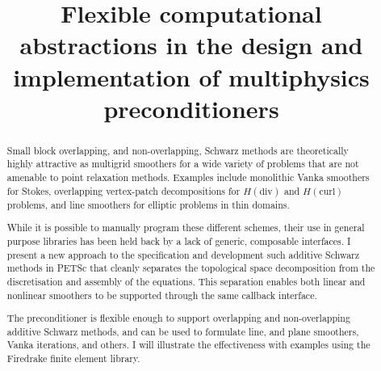 \title{Flexible computational abstractions in the design and
  implementation of multiphysics preconditioners}


\begin{abstract}
  Small block overlapping, and non-overlapping, Schwarz methods are
  theoretically highly attractive as multigrid smoothers for a wide
  variety of problems that are not amenable to point relaxation
  methods. Examples include monolithic Vanka smoothers for Stokes,
  overlapping vertex-patch decompositions for $H(\text{div})$ and
  $H(\text{curl})$ problems, and line smoothers for elliptic problems
  in thin domains.

  While it is possible to manually program these different schemes,
  their use in general purpose libraries has been held back by a lack
  of generic, composable interfaces. I present a new approach to the
  specification and development such additive Schwarz methods in PETSc
  that cleanly separates the topological space decomposition from the
  discretisation and assembly of the equations. This separation
  enables both linear and nonlinear smoothers to be supported through
  the same callback interface.

  The preconditioner is flexible enough to support overlapping and
  non-overlapping additive Schwarz methods, and can be used to
  formulate line, and plane smoothers, Vanka iterations, and others. I
  will illustrate the effectiveness with examples using the Firedrake
  finite element library.
\end{abstract}

%
%


